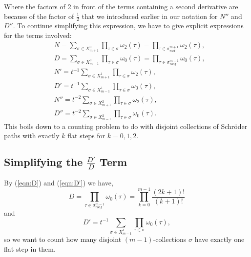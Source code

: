 \documentclass[11pt]{article}
\theoremstyle{mythm}
\begin{document}
Where the factors of 2 in front of the terms containing a second derivative are because of the factor of $\frac{1}{2}$ that we introduced earlier in our notation for $N''$ and $D''$. To continue simplifying this expression, we have to give explicit expressions for the terms involved:
\begin{align}
&N = \sum\limits_{\sigma\in X_{m+1}^0}\prod\limits_{\tau\in\sigma}\omega_2(\tau) = \prod\limits_{\tau\in\sigma_{\text{roof}}^{m+1}}\omega_2(\tau), \label{eqn:N} \\
&D = \sum\limits_{\sigma\in X_{m-1}^0}\prod\limits_{\tau\in\sigma}\omega_0(\tau) = \prod\limits_{\tau\in\sigma_{roof}^{m-1}}\omega_0(\tau), \label{eqn:D} \\
&N' = t^{-1}\sum\limits_{\sigma\in X_{m+1}^1}\prod\limits_{\tau\in\sigma}\omega_2(\tau), \label{eqn:N'} \\
&D' = t^{-1}\sum\limits_{\sigma\in X_{m-1}^1}\prod\limits_{\tau\in\sigma}\omega_0(\tau), \label{eqn:D'} \\
&N'' = t^{-2}\sum\limits_{\sigma\in X_{m+1}^2}\prod\limits_{\tau\in\sigma}\omega_2(\tau), \label{eqn:N''} \\
&D'' = t^{-2}\sum\limits_{\sigma\in X_{m-1}^2}\prod\limits_{\tau\in\sigma}\omega_0(\tau) \label{eqn:D''}.
\end{align}
This boils down to a counting problem to do with disjoint collections of Schröder paths with exactly $k$ flat steps for $k = 0,1,2$.

\subsection{Simplifying the $\frac{D'}{D}$ Term}

By (\ref{eqn:D}) and (\ref{eqn:D'}) we have,
\begin{equation*}
D = \prod\limits_{\tau\in\sigma_{roof}^{m-1}}\omega_0(\tau) = \prod\limits_{k=0}^{m-1}\frac{(2k+1)!}{(k+1)!}
\end{equation*}
and
\begin{equation*}
D' = t^{-1}\sum\limits_{\sigma\in X_{m-1}^1}\prod\limits_{\tau\in\sigma}\omega_0(\tau),
\end{equation*}
so we want to count how many disjoint $(m-1)$-collections $\sigma$ have exactly one flat step in them.
\end{document}
